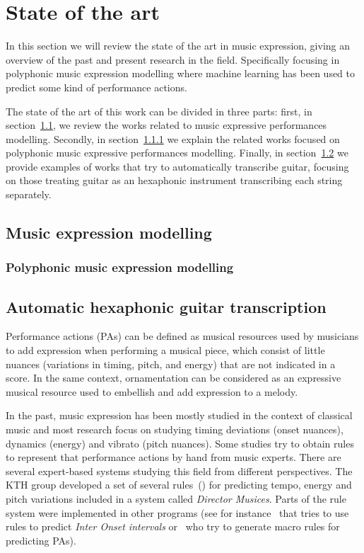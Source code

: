 \normallinespacing
\chapter{State of the art}
\label{chap:sota}
In this section we will review the state of the art in music expression, giving an
overview of the past and present research in the field. Specifically focusing in polyphonic music expression modelling where machine learning has been used to predict some kind of performance actions.

The state of the art of this work can be divided in three parts: first, in section~\ref{sec:muexpmod}, we review the works related to music expressive performances modelling. Secondly, in section~\ref{sec:polymuexpmod} we explain the related works focused on polyphonic music expressive performances modelling. Finally, in section~\ref{sec:autohexaguit} we provide examples of works that try to automatically transcribe guitar, focusing on those treating guitar as an hexaphonic instrument transcribing each string separately.

\section{Music expression modelling}
\label{sec:muexpmod}
\subsection{Polyphonic music expression modelling}
\label{sec:polymuexpmod}
\section{Automatic hexaphonic guitar transcription}
\label{sec:autohexaguit}


Performance actions (PAs) can be defined as musical resources used by musicians to add expression when performing a musical piece, which consist of little nuances (variations in timing, pitch, and energy) that are not indicated in a score. In the same context, ornamentation can be considered as an expressive musical resource used to embellish and add expression to a melody. 

In the past, music expression has been mostly studied in the context of classical music and most research focus on studying timing deviations (onset nuances), dynamics (energy) and vibrato (pitch nuances). Some studies try to obtain rules to represent that performance actions by hand from music experts. There are several expert-based systems studying this field from different perspectives. The KTH group developed a set of several rules~(\cite{Friberg2009}) for predicting tempo, energy and pitch variations included in a system called \textit{Director Musices}. Parts of the rule system were implemented in other programs (see for instance~\cite{Sundberg2003} that tries to use rules to predict \textit{Inter Onset intervals} or~\cite{Bresin2000} who try to generate macro rules for predicting PAs).

